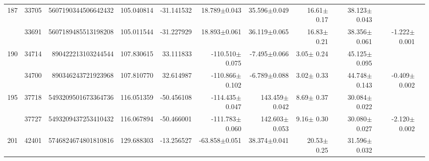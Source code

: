 \documentclass{ws-ijmpd}
\begin{document}
\begin{landscape}
\begin{longtable}{rrrrrrrrrrl}
 \hline 187 &   33705 &      5607190344506642432 &                   105.040814 &                   -31.141532 &                 18.789$\pm$0.043 &                 35.596$\pm$0.049 &          16.61$\pm$  0.17 &        38.123$\pm$0.043 &                                           &                                                    \\
            &   33691 &      5607189485513198208 &                   105.011544 &                   -31.227929 &                 18.893$\pm$0.061 &                 36.119$\pm$0.065 &          16.83$\pm$  0.21 &        38.356$\pm$0.061 &                          -1.222$\pm$0.001 &                                                    \\
 \hline 190 &   34714 &       890422213103244544 &                   107.830615 &                    33.111833 &               -110.510$\pm$0.075 &                 -7.495$\pm$0.066 &           3.05$\pm$  0.24 &        45.125$\pm$0.095 &                                           &                                                    \\
            &   34700 &       890346243721923968 &                   107.810770 &                    32.614987 &               -110.866$\pm$0.102 &                 -6.789$\pm$0.088 &           3.02$\pm$  0.33 &        44.748$\pm$0.143 &                          -0.409$\pm$0.002 &                                                    \\
 \hline 195 &   37718 &      5493209501673364736 &                   116.051359 &                   -50.456108 &               -114.435$\pm$0.047 &                143.459$\pm$0.042 &           8.69$\pm$  0.37 &        30.084$\pm$0.022 &                                           &                                                    \\
            &   37727 &      5493209437253410432 &                   116.067894 &                   -50.466001 &               -111.783$\pm$0.060 &                142.603$\pm$0.053 &           9.16$\pm$  0.30 &        30.080$\pm$0.027 &                          -2.120$\pm$0.002 &                                                    \\
 \hline 201 &   42401 &      5746824674801810816 &                   129.688303 &                   -13.256527 &                -63.858$\pm$0.051 &                 38.374$\pm$0.041 &          20.53$\pm$  0.25 &        31.596$\pm$0.032 &                                           &                                                    \\

\end{longtable}
\end{landscape}
\end{document}
